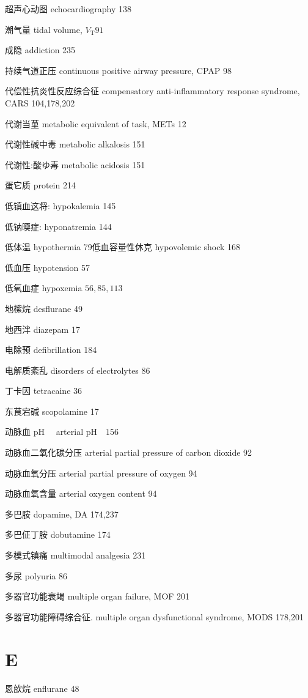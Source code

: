 \documentclass[10pt]{article}
\begin{document}
超声心动图 echocardiography 138

潮气量 tidal volume, $V_{\mathrm{T}} 91$

成隐 addiction 235

持续气道正压 continuous positive airway pressure, CPAP 98

代偿性抗炎性反应综合征 compensatory anti-inflammatory response syndrome, CARS 104,178,202

代谢当荲 metabolic equivalent of task, METs 12

代谢性碱中毒 metabolic alkalosis 151

代谢性:酸ゆ毒 metabolic acidosis 151

蛋它质 protein 214

低镇血这将: hypokalemia 145

低钠㬉症: hyponatremia 144

低体温 hypothermia 79低血容量性休克 hypovolemic shock 168

低血压 hypotension 57

低氧血症 hypoxemia $56,85,113$

地橴烷 desflurane 49

地西泮 diazepam 17

电除预 defibrillation 184

电解质紊乱 disorders of electrolytes 86

丁卡因 tetracaine 36

东茛宕碱 scopolamine 17

动脉血 $\mathrm{pH} \quad$ arterial $\mathrm{pH} \quad 156$

动脉血二氧化碳分压 arterial partial pressure of carbon dioxide 92

动脉血氧分压 arterial partial pressure of oxygen 94

动脉血氧含量 arterial oxygen content 94

多巴胺 dopamine, DA 174,237

多巴佂丁胺 dobutamine 174

多模式镇痛 multimodal analgesia 231

多尿 polyuria 86

多器官功能衰竭 multiple organ failure, MOF 201

多器官功能障碍综合征. multiple organ dysfunctional syndrome, MODS 178,201

\section*{E}
恩㰧烷 enflurane 48
\end{document}

